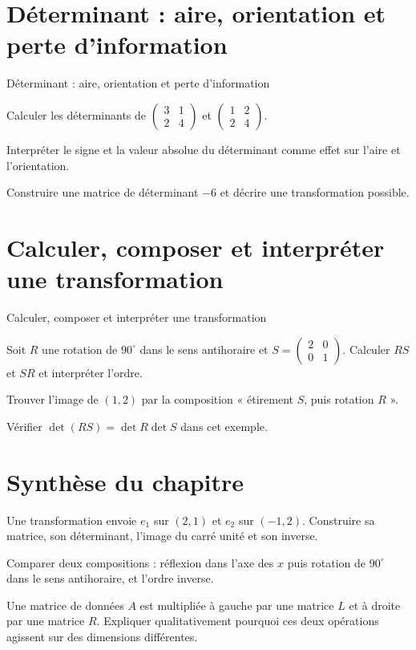 \section{Déterminant : aire, orientation et perte d'information}
\label{workbook:section:11.07}
\begin{exerciseblock}{Déterminant : aire, orientation et perte d'information}
\item Calculer les déterminants de $\begin{pmatrix}3&1\\2&4\end{pmatrix}$ et $\begin{pmatrix}1&2\\2&4\end{pmatrix}$.
\item Interpréter le signe et la valeur absolue du déterminant comme effet sur l'aire et l'orientation.
\item Construire une matrice de déterminant $-6$ et décrire une transformation possible.
\end{exerciseblock}
\section{Calculer, composer et interpréter une transformation}
\label{workbook:section:11.08}
\begin{exerciseblock}{Calculer, composer et interpréter une transformation}
\item Soit $R$ une rotation de $90^\circ$ dans le sens antihoraire et $S=\begin{pmatrix}2&0\\0&1\end{pmatrix}$. Calculer $RS$ et $SR$ et interpréter l'ordre.
\item Trouver l'image de $(1,2)$ par la composition « étirement $S$, puis rotation $R$ ».
\item Vérifier $\det(RS)=\det R\det S$ dans cet exemple.
\end{exerciseblock}
\section*{Synthèse du chapitre}
\begin{synthesisbox}
\item Une transformation envoie $e_1$ sur $(2,1)$ et $e_2$ sur $(-1,2)$. Construire sa matrice, son déterminant, l'image du carré unité et son inverse.
\item Comparer deux compositions : réflexion dans l'axe des $x$ puis rotation de $90^\circ$ dans le sens antihoraire, et l'ordre inverse.
\item Une matrice de données $A$ est multipliée à gauche par une matrice $L$ et à droite par une matrice $R$. Expliquer qualitativement pourquoi ces deux opérations agissent sur des dimensions différentes.
\end{synthesisbox}
